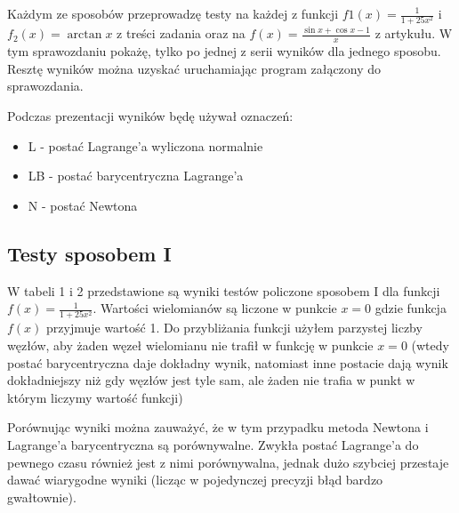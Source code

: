 \documentclass[a4paper]{article}
\begin{document}
Każdym ze sposobów przeprowadzę testy na każdej z funkcji $f1(x) = \frac{1}{1+25x^2}$ i 
$f_2(x) = \arctan{x}$ z treści zadania oraz na $f(x) = \frac{\sin{x} + \cos{x} - 1}{x}$ z artykułu.
W tym sprawozdaniu pokażę, tylko po jednej z serii wyników dla jednego sposobu. 
Resztę wyników można uzyskać uruchamiając program załączony do sprawozdania.

Podczas prezentacji wyników będę używał oznaczeń:
\begin{itemize}
  \item L - postać Lagrange'a wyliczona normalnie
  \item LB - postać barycentryczna Lagrange'a
  \item N - postać Newtona
\end{itemize}

\subsection{Testy sposobem I}
W tabeli 1 i 2 przedstawione są wyniki testów policzone sposobem I dla funkcji 
$f(x) = \frac{1}{1+25x^2}$. Wartości wielomianów są liczone w punkcie $x=0$ gdzie funkcja $f(x)$
przyjmuje wartość 1. Do przybliżania funkcji użyłem parzystej liczby węzłów, aby żaden węzeł 
wielomianu nie trafił w funkcję w punkcie $x=0$ (wtedy postać barycentryczna daje dokładny wynik, 
natomiast inne postacie dają wynik dokładniejszy niż gdy węzłów jest tyle sam, ale żaden nie trafia
w punkt w którym liczymy wartość funkcji)

Porównując wyniki można zauważyć, że w tym przypadku metoda Newtona i Lagrange'a barycentryczna są
porównywalne. Zwykła postać Lagrange'a do pewnego czasu również jest z nimi porównywalna, jednak
dużo szybciej przestaje dawać wiarygodne wyniki (licząc w pojedynczej precyzji błąd bardzo 
gwałtownie).
\end{document}

